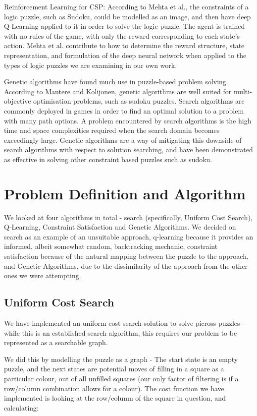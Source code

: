 \documentclass{svproc}
\begin{document}
Reinforcement Learning for CSP: According to Mehta et al.\cite{Qlearning}, the constraints of a logic puzzle, such as Sudoku, could be modelled as an image, and then have deep Q-Learning applied to it in order to solve the logic puzzle.
The agent is trained with no rules of the game, with only the reward corresponding to each state's action.
Mehta et al. contribute to how to determine the reward structure, state representation, and formulation of the deep neural network when applied to the types of logic puzzles we are examining in our own work.

Genetic algorithms have found much use in puzzle-based problem solving.
According to Mantere and Kolijonen\cite{geneticAlgo}, genetic algorithms are well suited for multi-objective optimisation problems, such as sudoku puzzles.
Search algorithms are commonly deployed in games in order to find an optimal solution to a problem with many path options.
A problem encountered by search algorithms is the high time and space complexities required when the search domain becomes exceedingly large.
Genetic algorithms are a way of mitigating this downside of search algorithms with respect to solution searching, and have been demonstrated as effective in solving other constraint based puzzles such as sudoku.

\section{Problem Definition and Algorithm}
We looked at four algorithms in total - search (specifically, Uniform Cost Search), Q-Learning, Constraint Satisfaction and Genetic Algorithms.
We decided on search as an example of an unsuitable approach, q-learning because it provides an informed, albeit somewhat random, backtracking mechanic, constraint satisfaction because of the natural mapping between the puzzle to the approach, and Genetic Algorithms, due to the dissimilarity of the approach from the other ones we were attempting.

\subsection{Uniform Cost Search}
We have implemented an uniform cost search solution to solve picross puzzles - while this is an established search algorithm, this requires our problem to be represented as a searchable graph.

We did this by modelling the puzzle as a graph - The start state is an empty puzzle, and the next states are potential moves of filling in a square as a particular colour, out of all unfilled squares (our only factor of filtering is if a row/column combination allows for a colour).
The cost function we have implemented is looking at the row/column of the square in question, and calculating:
\end{document}
